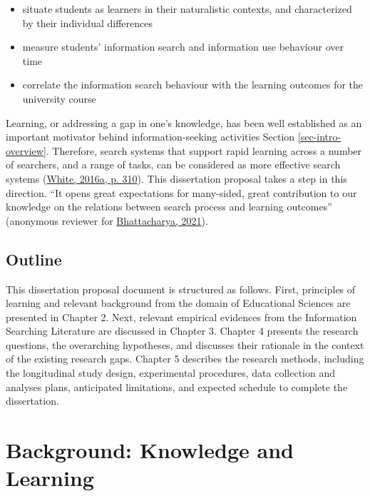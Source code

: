 \documentclass[letterpaper, nobind]{templates/ociamthesis}
\providecommand{\tightlist}{%
  \setlength{\itemsep}{0pt}\setlength{\parskip}{0pt}}
\begin{document}
\begin{itemize}
\tightlist
\item
  situate students as learners in their naturalistic contexts, and characterized by their individual differences
\item
  measure students' information search and information use behaviour over time
\item
  correlate the information search behaviour with the learning outcomes for the university course
\end{itemize}

Learning, or addressing a gap in one's knowledge, has been well established as an important motivator behind information-seeking activities
Section \ref{sec-intro-overview}.
Therefore, search systems that support rapid learning across a number of searchers, and a range of tasks, can be considered as more effective search systems (\protect\hyperlink{ref-white2016interactions}{White, 2016a, p. 310}).
This dissertation proposal takes a step in this direction.
``It opens great expectations for many-sided, great contribution to our knowledge on the relations between search process and learning outcomes'' (anonymous reviewer for \protect\hyperlink{ref-bhattacharya2021longitudinal}{Bhattacharya, 2021}).

\hypertarget{sec-intro-outline}{%
\section{Outline}\label{sec-intro-outline}}

This dissertation proposal document is structured as follows.
First, principles of learning and relevant background from the domain of Educational Sciences are presented in Chapter 2.
Next, relevant empirical evidences from the Information Searching Literature are discussed in Chapter 3.
Chapter 4 presents the research questions, the overarching hypotheses, and discusses their rationale in the context of
the existing research gaps.
Chapter 5 describes the research methods, including the longitudinal study design, experimental procedures, data collection and analyses plans, anticipated limitations, and expected schedule to complete the dissertation.

\hypertarget{ch-bg-learn}{%
\chapter{Background: Knowledge and Learning}\label{ch-bg-learn}}
\end{document}
